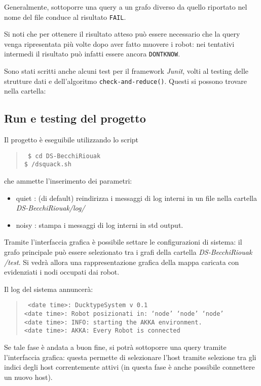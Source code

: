 Generalmente, sottoporre una query a un grafo diverso da quello riportato
nel nome del file conduce al risultato \texttt{FAIL}.

Si noti che per ottenere il risultato atteso può essere necessario
che la query venga ripresentata più volte dopo aver fatto muovere i robot:
nei tentativi intermedi il risultato può infatti essere ancora \texttt{DONTKNOW}.

Sono stati scritti anche alcuni test per il framework \emph{Junit}, volti al
testing delle strutture dati e dell'algoritmo \texttt{check-and-reduce()}.
Questi si possono trovare nella cartella:

\subsection{Run e testing del progetto}
Il progetto è eseguibile utilizzando lo script

\begin{quote}\texttt{
    \$ cd DS-BecchiRiouak\\
    \$ /dsquack.sh }
\end{quote}
che ammette l'inserimento dei parametri:
\begin{itemize}
\item quiet : (di default) reindirizza i messaggi di log interni in un file nella
  cartella \emph{DS-BecchiRiouak/log/ }
\item noisy : stampa i messaggi di log interni in std output.
\end{itemize}

Tramite l'interfaccia grafica è possibile settare le configurazioni di sistema:
il grafo principale può essere selezionato tra i grafi della cartella
\emph{DS-BecchiRiouak /test}.
Si vedrà allora una rappresentazione grafica della mappa caricata con
evidenziati i nodi occupati dai robot.

Il log del sistema annuncerà:
\begin{quote}\texttt{
 <date time>: DucktypeSystem v 0.1\\
 <date time>: Robot posizionati in: `node' `node' `node'\\
 <date time>: INFO: starting the AKKA environment.\\
 <date time>: AKKA: Every Robot is connected
 }
\end{quote}

Se tale fase è andata a buon fine, si potrà sottoporre una query tramite
l'interfaccia grafica: questa permette di selezionare l'host tramite selezione
tra gli indici degli host correntemente attivi (in questa fase è anche possibile
connettere un nuovo host).

